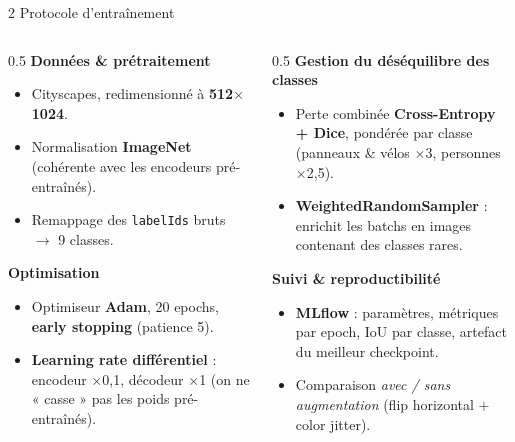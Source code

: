 \documentclass[aspectratio=169,11pt]{beamer}
\newcommand{\emphc}[1]{\textbf{\color{cvblue}#1}}
\newcommand{\code}[1]{\texttt{\small #1}}
\begin{document}
\begin{frame}{2 \textbar{} Protocole d'entraînement}
  \begin{columns}[T]
    \begin{column}{0.5\textwidth}
      \textbf{Données \& prétraitement}
      \begin{itemize}\footnotesize
        \item Cityscapes, redimensionné à \emphc{512$\times$1024}.
        \item Normalisation \emphc{ImageNet} (cohérente avec les encodeurs pré-entraînés).
        \item Remappage des \code{labelIds} bruts $\rightarrow$ 9 classes.
      \end{itemize}
      \vspace{0.3em}
      \textbf{Optimisation}
      \begin{itemize}\footnotesize
        \item Optimiseur \emphc{Adam}, 20 epochs, \emphc{early stopping} (patience 5).
        \item \emphc{Learning rate différentiel} : encodeur $\times$0{,}1, décodeur $\times$1
          (on ne « casse » pas les poids pré-entraînés).
      \end{itemize}
    \end{column}
    \begin{column}{0.5\textwidth}
      \textbf{Gestion du \emphc{déséquilibre des classes}}
      \begin{itemize}\footnotesize
        \item Perte combinée \emphc{Cross-Entropy + Dice}, pondérée par classe
          (panneaux \& vélos $\times$3, personnes $\times$2{,}5).
        \item \emphc{WeightedRandomSampler} : enrichit les batchs en images
          contenant des classes rares.
      \end{itemize}
      \vspace{0.3em}
      \textbf{Suivi \& reproductibilité}
      \begin{itemize}\footnotesize
        \item \emphc{MLflow} : paramètres, métriques par epoch, IoU par classe,
          artefact du meilleur checkpoint.
        \item Comparaison \emph{avec / sans augmentation} (flip horizontal + color jitter).
      \end{itemize}
    \end{column}
  \end{columns}
\end{frame}
\end{document}
